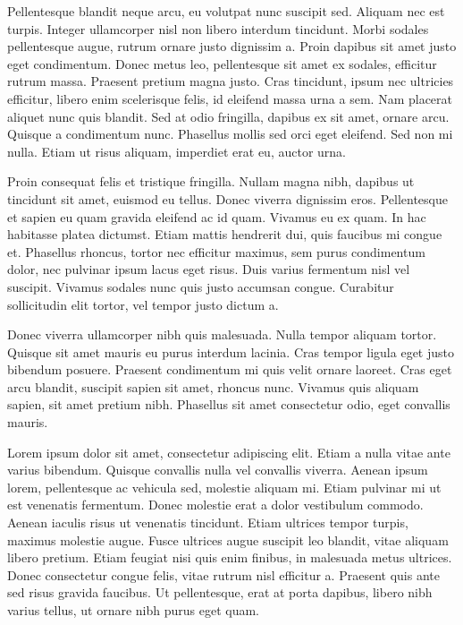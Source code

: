 \documentclass{novanarrative}
\begin{document}
Pellentesque blandit neque arcu, eu volutpat nunc suscipit sed. Aliquam nec est turpis. Integer ullamcorper nisl non libero interdum tincidunt. Morbi sodales pellentesque augue, rutrum ornare justo dignissim a. Proin dapibus sit amet justo eget condimentum. Donec metus leo, pellentesque sit amet ex sodales, efficitur rutrum massa. Praesent pretium magna justo. Cras tincidunt, ipsum nec ultricies efficitur, libero enim scelerisque felis, id eleifend massa urna a sem. Nam placerat aliquet nunc quis blandit. Sed at odio fringilla, dapibus ex sit amet, ornare arcu. Quisque a condimentum nunc. Phasellus mollis sed orci eget eleifend. Sed non mi nulla. Etiam ut risus aliquam, imperdiet erat eu, auctor urna.

Proin consequat felis et tristique fringilla. Nullam magna nibh, dapibus ut tincidunt sit amet, euismod eu tellus. Donec viverra dignissim eros. Pellentesque et sapien eu quam gravida eleifend ac id quam. Vivamus eu ex quam. In hac habitasse platea dictumst. Etiam mattis hendrerit dui, quis faucibus mi congue et. Phasellus rhoncus, tortor nec efficitur maximus, sem purus condimentum dolor, nec pulvinar ipsum lacus eget risus. Duis varius fermentum nisl vel suscipit. Vivamus sodales nunc quis justo accumsan congue. Curabitur sollicitudin elit tortor, vel tempor justo dictum a.

Donec viverra ullamcorper nibh quis malesuada. Nulla tempor aliquam tortor. Quisque sit amet mauris eu purus interdum lacinia. Cras tempor ligula eget justo bibendum posuere. Praesent condimentum mi quis velit ornare laoreet. Cras eget arcu blandit, suscipit sapien sit amet, rhoncus nunc. Vivamus quis aliquam sapien, sit amet pretium nibh. Phasellus sit amet consectetur odio, eget convallis mauris.

Lorem ipsum dolor sit amet, consectetur adipiscing elit. Etiam a nulla vitae ante varius bibendum. Quisque convallis nulla vel convallis viverra. Aenean ipsum lorem, pellentesque ac vehicula sed, molestie aliquam mi. Etiam pulvinar mi ut est venenatis fermentum. Donec molestie erat a dolor vestibulum commodo. Aenean iaculis risus ut venenatis tincidunt. Etiam ultrices tempor turpis, maximus molestie augue. Fusce ultrices augue suscipit leo blandit, vitae aliquam libero pretium. Etiam feugiat nisi quis enim finibus, in malesuada metus ultrices. Donec consectetur congue felis, vitae rutrum nisl efficitur a. Praesent quis ante sed risus gravida faucibus. Ut pellentesque, erat at porta dapibus, libero nibh varius tellus, ut ornare nibh purus eget quam.
\end{document}
